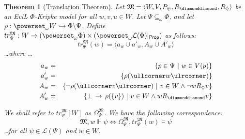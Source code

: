 \documentclass[11pt]{article}
\newtheorem{theorem}{Theorem}
\newcommand{\bs}{\ensuremath{\backslash}}
\newcommand{\ra}{\rangle}
\newcommand{\la}{\langle}
\newcommand{\DD}{\diamonddiamond}
\newcommand{\Pos}{\Diamond}
\newcommand{\lc}{\ullcorner}
\newcommand{\rc}{\ulrcorner}
\begin{document}
 \begin{theorem}[Translation Theorem]
 Let $\mathfrak{M} = \la W, V, P_\oplus, R_{\DD}, R_{\Pos} \ra$ be an \textsf{EviL} $\Phi$-Kripke model
 for all $w,v,u \in W$.  Let $\Psi \subseteq_\omega \Phi$, and let $\rho : \powerset_\omega W \hookrightarrow \Phi \bs \Psi$.  Define $tr_{\Psi}^\mathfrak{M}: W \to (\powerset_\omega \Phi) \times (\powerset_\omega \mathcal{L}(\Phi)|_{\mathsf{Prop}})$ as follows:
 \[ tr_{\Psi}^\mathfrak{M}(w) =  \la  a_w \cup a'_w, A_w \cup A'_w \ra\]
\ldots where \ldots
 \begin{eqnarray*}
 a_w & = & \{ p \in \Psi \ |\  w \in V(p) \}\\
 a'_w & = & \{ \rho(\lc w\rc) \} \\
 A_w & = & \{ \neg \rho(\lc v\rc) \ | \ v \in W \wedge \neg w R_\Pos v \}\\
 A'_w & = & \{ \bot \IMPL \rho(\{v\})\ | \ v \in W \wedge w R_\DD v \}
\end{eqnarray*}

We shall refer to $tr_{\Psi}^\mathfrak{M}[W]$ as $\Omega_{\Psi}^\mathfrak{M}$.  We have the following correspondence:
 \[ \mathfrak{M},w \Vdash \psi \iff \Omega_{\Psi}^\mathfrak{M},tr_{\Psi}^\mathfrak{M}(w) \models \psi \] 
\ldots for all $\psi \in \mathcal{L}(\Psi)$ and $w \in W$.
 \end{theorem}
\end{document}
